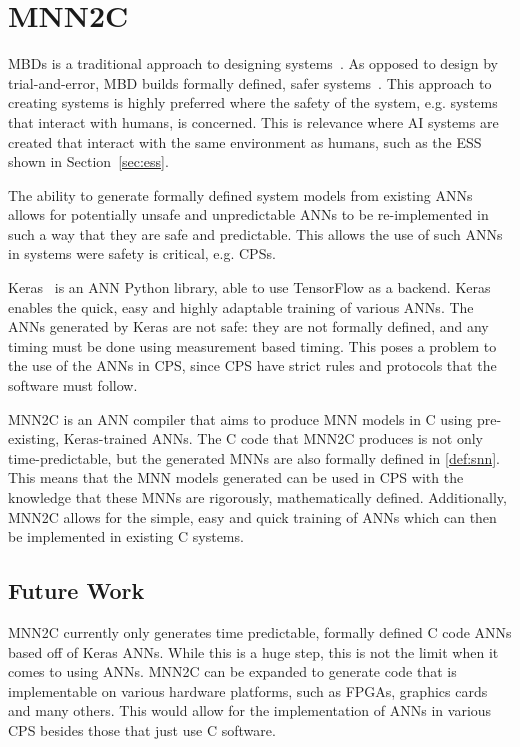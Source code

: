 \section{\acf{MNN2C}}
\label{sec:mnn2c}
\acfp{MBD} is a traditional approach to designing systems~\cite{dmd2019}.
As opposed to design by trial-and-error, \ac{MBD} builds formally defined, safer systems~\cite{dmd2019}.
This approach to creating systems is highly preferred where the safety of the system, e.g. systems that interact with humans, is concerned.
This is relevance where \ac{AI} systems are created that interact with the same environment as humans, such as the \acf{ESS} shown in Section~\ref{sec:ess}.

The ability to generate formally defined system models from existing \acp{ANN} allows for potentially unsafe and unpredictable \acp{ANN} to be re-implemented in such a way that they are safe and predictable.
This allows the use of such \acp{ANN} in systems were safety is critical, e.g. \acfp{CPS}.

Keras~\cite{chollet2015keras} is an \ac{ANN} Python library, able to use TensorFlow as a backend. 
Keras enables the quick, easy and highly adaptable training of various \acp{ANN}.
The \acp{ANN} generated by Keras are not safe: they are not formally defined, and any timing must be done using measurement based timing. 
This poses a problem to the use of the \acp{ANN} in \ac{CPS}, since \ac{CPS} have strict rules and protocols that the software must follow.

\acf{MNN2C} is an \ac{ANN} compiler that aims to produce \acf{MNN} models in C using pre-existing, Keras-trained \acp{ANN}.
The C code that \ac{MNN2C} produces is not only time-predictable, but the generated \acp{MNN} are also formally defined in \ref{def:snn}.
This means that the \ac{MNN} models generated can be used in \ac{CPS} with the knowledge that these \acp{MNN} are rigorously, mathematically defined. 
Additionally, \ac{MNN2C} allows for the simple, easy and quick training of \acp{ANN} which can then be implemented in existing C systems.

\subsection{Future Work}
\ac{MNN2C} currently only generates time predictable, formally defined C code \acp{ANN} based off of Keras \acp{ANN}.
While this is a huge step, this is not the limit when it comes to using \acp{ANN}.
\ac{MNN2C} can be expanded to generate code that is implementable on various hardware platforms, such as \acp{FPGA}, graphics cards and many others.
This would allow for the implementation of \acp{ANN} in various \ac{CPS} besides those that just use C software.












